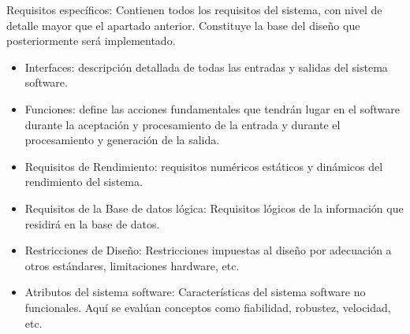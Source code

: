 {\Large Requisitos específicos:} Contienen todos los requisitos del sistema, con nivel de detalle mayor que el apartado anterior. Constituye la base del diseño que posteriormente será implementado.
\begin{itemize}
\item Interfaces: descripción detallada de todas las entradas y salidas del sistema software.
\item Funciones: define las acciones fundamentales que tendrán lugar en el software durante la aceptación y procesamiento de la entrada y durante el procesamiento y generación de la salida.
\item Requisitos de Rendimiento: requisitos numéricos estáticos y dinámicos del rendimiento del sistema.
\item Requisitos de la Base de datos lógica: Requisitos lógicos de la información que residirá en la base de datos.
\item Restricciones de Diseño: Restricciones impuestas al diseño por adecuación a otros estándares, limitaciones hardware, etc.
\item Atributos del sistema software: Características del sistema software no funcionales. Aquí se evalúan conceptos como fiabilidad, robustez, velocidad, etc.
\end{itemize}